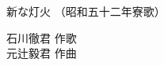 \documentclass[10pt,b5j]{tarticle} %
\begin{document}
\begin{minipage}[c]{0.7\hsize} %
    \begin{center}
        {\LARGE
            新な灯火 %
        }
        {\small 
            （昭和五十二年寮歌） %
        }
    \end{center}
\end{minipage}
\begin{minipage}[c]{0.3\hsize} %
    \begin{flushright} %
        石川徹君 作歌\\元辻毅君 作曲 %
    \end{flushright}
\end{minipage}
\end{document}
